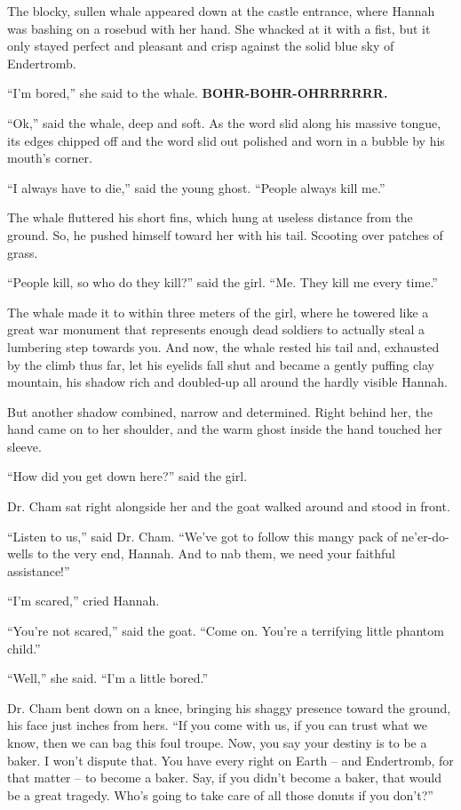 \documentclass[10pt,twoside]{report}
\begin{document}
The blocky, sullen whale appeared down at the castle entrance, where
Hannah was bashing on a rosebud with her hand.  She whacked at it with
a fist, but it only stayed perfect and pleasant and crisp against the
solid blue sky of Endertromb.

``I'm bored,'' she said to the whale.  {\bf BOHR-BOHR-OHRRRRRR.}

``Ok,'' said the whale, deep and soft.  As the word slid along his
massive tongue, its edges chipped off and the word slid out polished
and worn in a bubble by his mouth's corner.

``I always have to die,'' said the young ghost.  ``People always kill
me.''

The whale fluttered his short fins, which hung at useless distance
from the ground. So, he pushed himself toward her with his tail.
Scooting over patches of grass.

``People kill, so who do they kill?'' said the girl.  ``Me.  They kill
me every time.''

The whale made it to within three meters of the girl, where he towered
like a great war monument that represents enough dead soldiers to
actually steal a lumbering step towards you.  And now, the whale
rested his tail and, exhausted by the climb thus far, let his eyelids
fall shut and became a gently puffing clay mountain, his shadow rich
and doubled-up all around the hardly visible Hannah.

But another shadow combined, narrow and determined.  Right behind her,
the hand came on to her shoulder, and the warm ghost inside the hand
touched her sleeve.

``How did you get down here?'' said the girl.

Dr. Cham sat right alongside her and the goat walked around and stood
in front.

``Listen to us,'' said Dr. Cham.  ``We've got to follow this mangy
pack of ne'er-do-wells to the very end, Hannah.  And to nab them, we
need your faithful assistance!''

``I'm scared,'' cried Hannah.

``You're not scared,'' said the goat.  ``Come on.  You're a terrifying
little phantom child.''

``Well,'' she said.  ``I'm a little bored.''

Dr. Cham bent down on a knee, bringing his shaggy presence toward the
ground, his face just inches from hers.  ``If you come with us, if you
can trust what we know, then we can bag this foul troupe.  Now, you
say your destiny is to be a baker.  I won't dispute that. You have
every right on Earth -- and Endertromb, for that matter -- to become a
baker. Say, if you didn't become a baker, that would be a great
tragedy.  Who's going to take care of all those donuts if you don't?''
\end{document}
